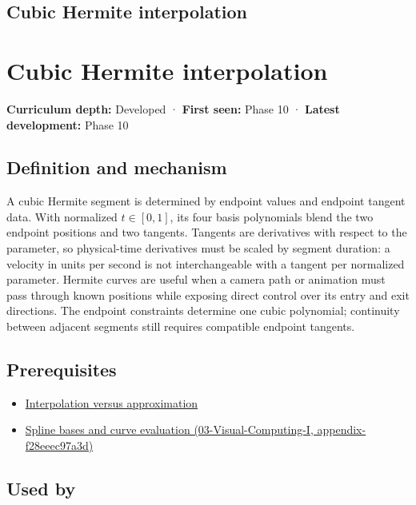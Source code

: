\hypertarget{appendix-db3aef8f2fd6}{}
\section*{Cubic Hermite interpolation}
\chapter{Cubic Hermite interpolation}\label{appendix-db3aef8f2fd6-cubic-hermite-interpolation}

\textbf{Curriculum depth:} Developed · \textbf{First seen:} Phase 10 · \textbf{Latest development:} Phase 10

\section{Definition and mechanism}\label{appendix-db3aef8f2fd6-definition-and-mechanism}

A cubic Hermite segment is determined by endpoint values and endpoint tangent data. With normalized \(t\in[0,1]\), its four basis polynomials blend the two endpoint positions and two tangents. Tangents are derivatives with respect to the parameter, so physical-time derivatives must be scaled by segment duration: a velocity in units per second is not interchangeable with a tangent per normalized parameter. Hermite curves are useful when a camera path or animation must pass through known positions while exposing direct control over its entry and exit directions. The endpoint constraints determine one cubic polynomial; continuity between adjacent segments still requires compatible endpoint tangents.

\section{Prerequisites}\label{appendix-db3aef8f2fd6-prerequisites}

\begin{itemize}
\tightlist
\item
  \hyperref[appendix-0c2a5f69851e]{Interpolation versus approximation}
\item
  \href{../03-Visual-Computing-I/main.pdf\#nameddest=appendix-f28eeec97a3d}{Spline bases and curve evaluation (03-Visual-Computing-I, appendix-f28eeec97a3d)}
\end{itemize}

\section{Used by}\label{appendix-db3aef8f2fd6-used-by}

